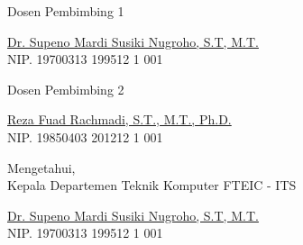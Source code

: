 {\begin{center}

    \begin{multicols}{2}

        Dosen Pembimbing 1
        \vspace{12ex}

        \underline{Dr. Supeno Mardi Susiki Nugroho, S.T, M.T.} \\
        NIP. 19700313 199512 1 001

        \columnbreak

        Dosen Pembimbing 2
        \vspace{12ex}

        \underline{Reza Fuad Rachmadi, S.T., M.T., Ph.D.} \\
        NIP. 19850403 201212 1 001

    \end{multicols}
    \vspace{6ex}

    Mengetahui, \\
    Kepala Departemen Teknik Komputer FTEIC - ITS
    \vspace{12ex}

    \underline{Dr. Supeno Mardi Susiki Nugroho, S.T, M.T.} \\
    NIP. 19700313 199512 1 001

\end{center}
}

